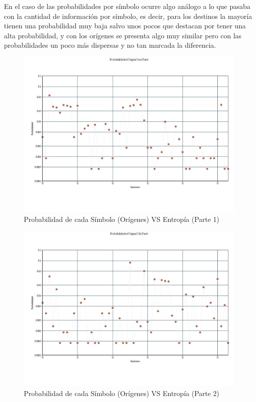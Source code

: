 En el caso de las probabilidades por símbolo ocurre algo análogo a lo que pasaba con la cantidad de información por símbolo, es decir, para los destinos la mayoría tienen una probabilidad muy baja salvo unos pocos que destacan por tener una alta probabilidad, y con los orígenes se presenta algo muy similar pero con las probabilidades un poco más dispersas y no tan marcada la diferencia.

\begin{figure}[H]
  \centering
    \includegraphics[scale=0.45]{imagenes/graficos/Probabilidades/02origen1eraParte.jpg}
  \caption{Probabilidad de cada Símbolo (Orígenes) VS Entropía (Parte 1)}
  \label{fig:ejemplo}
\end{figure}

\begin{figure}[H]
  \centering
    \includegraphics[scale=0.45]{imagenes/graficos/Probabilidades/02origen2daParte.jpg}
  \caption{Probabilidad de cada Símbolo (Orígenes) VS Entropía (Parte 2)}
  \label{fig:ejemplo}
\end{figure}

